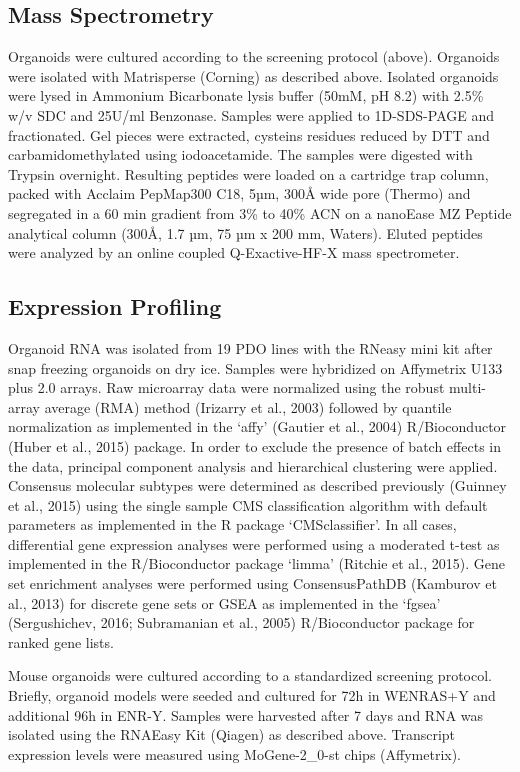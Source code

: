 \begin{flushleft}
\subsection{Mass Spectrometry}
Organoids were cultured according to the screening protocol (above). Organoids were isolated with Matrisperse (Corning) as described above. Isolated organoids were lysed in Ammonium Bicarbonate lysis buffer (50mM, pH 8.2) with 2.5\% w/v SDC and 25U/ml Benzonase. 
Samples were applied to 1D-SDS-PAGE and fractionated. Gel pieces were extracted, cysteins residues reduced by DTT and carbamidomethylated using iodoacetamide. The samples were digested with Trypsin overnight.
Resulting peptides were loaded on a cartridge trap column, packed with Acclaim PepMap300 C18, 5µm, 300Å wide pore (Thermo) and segregated in a 60 min gradient from 3\% to 40\% ACN on a nanoEase MZ Peptide analytical column (300Å, 1.7 µm, 75 µm x 200 mm, Waters). Eluted peptides were analyzed by an online coupled Q-Exactive-HF-X mass spectrometer.

\subsection{Expression Profiling}
Organoid RNA was isolated from 19 PDO lines with the RNeasy mini kit after snap freezing organoids on dry ice. Samples were hybridized on Affymetrix U133 plus 2.0 arrays. Raw microarray data were normalized using the robust multi-array average (RMA) method (Irizarry et al., 2003) followed by quantile normalization as implemented in the ‘affy’ (Gautier et al., 2004) R/Bioconductor (Huber et al., 2015) package. In order to exclude the presence of batch effects in the data, principal component analysis and hierarchical clustering were applied. Consensus molecular subtypes were determined as described previously (Guinney et al., 2015) using the single sample CMS classification algorithm with default parameters as implemented in the R package ‘CMSclassifier’. In all cases, differential gene expression analyses were performed using a moderated t-test as implemented in the R/Bioconductor package ‘limma’ (Ritchie et al., 2015). Gene set enrichment analyses were performed using ConsensusPathDB (Kamburov et al., 2013) for discrete gene sets or GSEA as implemented in the ‘fgsea’ (Sergushichev, 2016; Subramanian et al., 2005) R/Bioconductor package for ranked gene lists.

Mouse organoids were cultured according to a standardized screening protocol. Briefly, organoid models were seeded and cultured for 72h in WENRAS+Y and additional 96h in ENR-Y. Samples were harvested after 7 days and RNA was isolated using the RNAEasy Kit (Qiagen) as described above. Transcript expression levels were measured using MoGene-2\_0-st chips (Affymetrix).    


\end{flushleft}
